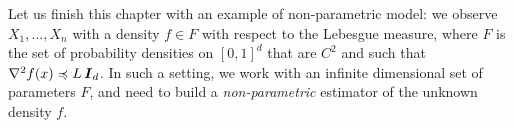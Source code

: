 Let us finish this chapter with an example of non-parametric model: we observe $X_1, \ldots, X_n$ with a density $f \in F$ with respect to the Lebesgue measure, where $F$ is the set of probability densities on $[0, 1]^d$ that are $C^2$ and such that $\nabla^2 f(x) \preccurlyeq L \operatorname{\boldsymbol I}_d$.%
%
In such a setting, we work with an infinite dimensional set of parameters $F$, and need to build a \emph{non-parametric} estimator of the unknown density $f$.
